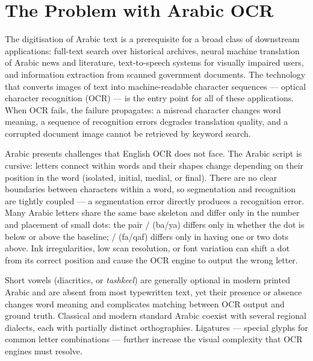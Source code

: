 
\section{The Problem with Arabic OCR}
\label{sec:intro_problem}

The digitisation of Arabic text is a prerequisite for a broad class of
downstream applications: full-text search over historical archives, neural
machine translation of Arabic news and literature, text-to-speech systems
for visually impaired users, and information extraction from scanned
government documents. The technology that converts images of text into
machine-readable character sequences --- optical character recognition (OCR)
--- is the entry point for all of these applications. When OCR fails, the
failure propagates: a misread character changes word meaning, a sequence of
recognition errors degrades translation quality, and a corrupted document
image cannot be retrieved by keyword search.

Arabic presents challenges that English OCR does not face. The Arabic script
is cursive: letters connect within words and their shapes change depending on
their position in the word (isolated, initial, medial, or final). There are
no clear boundaries between characters within a word, so segmentation and
recognition are tightly coupled --- a segmentation error directly produces a
recognition error. Many Arabic letters share the same base skeleton and
differ only in the number and placement of small dots: the pair /
(ba/ya) differs only in whether the dot is below or above the baseline;
/ (fa/qaf) differs only in having one or two dots above. Ink
irregularities, low scan resolution, or font variation can shift a dot from
its correct position and cause the OCR engine to output the wrong letter.

Short vowels (diacritics, or \textit{tashkeel}) are generally optional in
modern printed Arabic and are absent from most typewritten text, yet their
presence or absence changes word meaning and complicates matching between
OCR output and ground truth. Classical and modern standard Arabic coexist
with several regional dialects, each with partially distinct orthographies.
Ligatures --- special glyphs for common letter combinations --- further
increase the visual complexity that OCR engines must resolve.

